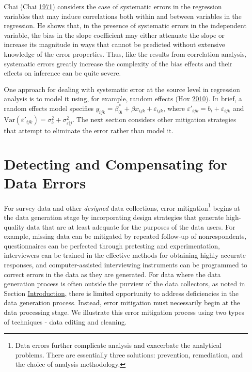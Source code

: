 \documentclass[]{krantz}
\begin{document}
Chai (Chai \protect\hyperlink{ref-chai1971correlated}{1971}) considers
the case of systematic errors in the regression variables that may
induce correlations both within and between variables in the regression.
He shows that, in the presence of systematic errors in the independent
variable, the bias in the slope coefficient may either attenuate the
slope or increase its magnitude in ways that cannot be predicted without
extensive knowledge of the error properties. Thus, like the results from
correlation analysis, systematic errors greatly increase the complexity
of the bias effects and their effects on inference can be quite severe.

One approach for dealing with systematic error at the source level in
regression analysis is to model it using, for example, random effects
(Hox \protect\hyperlink{ref-hox2010multilevel}{2010}). In brief, a
random effects model specifies
\(y_{ijk} = \beta_{0i}^\ast + \beta x_{ijk} + \varepsilon_{ijk}\), where
\({\varepsilon }'_{ijk} = b_i + \varepsilon_{ijk}\) and
\(\mathrm{Var}({\varepsilon }'_{ijk} ) = \sigma_b^2 + \sigma_{\varepsilon \vert j}^2\).
The next section considers other mitigation strategies that attempt to
eliminate the error rather than model it.

\enlargethispage{6pt} \vspace*{-4pt}

\section{Detecting and Compensating for Data Errors}\label{sec:10-5}

For survey data and other \emph{designed} data collections, error
mitigation\footnote{Data errors further complicate analysis and
  exacerbate the analytical problems. There are essentially three
  solutions: prevention, remediation, and the choice of analysis
  methodology.} begins at the data generation stage by incorporating
design strategies that generate high-quality data that are at least
adequate for the purposes of the data users. For example, missing data
can be mitigated by repeated follow-up of nonrespondents, questionnaires
can be perfected through pretesting and experimentation, interviewers
can be trained in the effective methods for obtaining highly accurate
responses, and computer-assisted interviewing instruments can be
programmed to correct errors in the data as they are generated. For data
where the data generation process is often outside the purview of the
data collectors, as noted in Section
\protect\hyperlink{sec:10-1}{Introduction}, there is limited opportunity
to address deficiencies in the data generation process. Instead, error
mitigation must necessarily begin at the data processing stage. We
illustrate this error mitigation process using two types of techniques -
data editing and cleaning.
\end{document}
